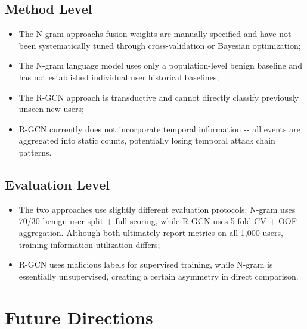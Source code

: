 \documentclass[
  a4paper,
  11pt]{article}
\providecommand{\tightlist}{%
  \setlength{\itemsep}{0pt}\setlength{\parskip}{0pt}}
\begin{document}
\subsection{Method Level}\label{method-level}

\begin{itemize}
\tightlist
\item
  The N-gram approach\textquotesingle s fusion weights are manually
  specified and have not been systematically tuned through
  cross-validation or Bayesian optimization;
\item
  The N-gram language model uses only a population-level benign baseline
  and has not established individual user historical baselines;
\item
  The R-GCN approach is transductive and cannot directly classify
  previously unseen new users;
\item
  R-GCN currently does not incorporate temporal information -\/- all
  events are aggregated into static counts, potentially losing temporal
  attack chain patterns.
\end{itemize}

\subsection{Evaluation Level}\label{evaluation-level}

\begin{itemize}
\tightlist
\item
  The two approaches use slightly different evaluation protocols: N-gram
  uses 70/30 benign user split + full scoring, while R-GCN uses 5-fold
  CV + OOF aggregation. Although both ultimately report metrics on all
  1,000 users, training information utilization differs;
\item
  R-GCN uses malicious labels for supervised training, while N-gram is
  essentially unsupervised, creating a certain asymmetry in direct
  comparison.
\end{itemize}

\section{Future Directions}\label{future-directions}
\end{document}
